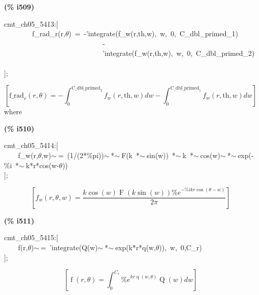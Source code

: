 \documentclass[fleqn]{article}
\begin{document}
\noindent
\begin{minipage}[t]{4.000000em}\color{red}\bfseries
(\% i509)	
\end{minipage}
\begin{minipage}[t]{\textwidth}\color{blue}
cmt\_ch05\_5413:[\\
\ \ \ \ \ \ \ \ f\_rad\_r(r,\ensuremath{\theta})\ =\ -'integrate(f\_w(r,th,w),\ w,\ 0,\ C\_dbl\_primed\_1)\\
\ \ \ \ \ \ \ \ \ \ \ \ \ \ \ \ \ \ \ \ \ \ \ \ \ \ \ \ -\\
\ \ \ \ \ \ \ \ \ \ \ \ \ \ \ \ \ \ \ \ \ \ \ \ \ \ \ \ 'integrate(f\_w(r,th,w),\ w,\ 0,\ C\_dbl\_primed\_2)\\
\\
];
\end{minipage}
\[\displaystyle \tag{\% o509} 
\left[ {{\ensuremath{\mathrm{f\_ rad}}}_r}\left( r\operatorname{,}\theta \right) =-\int_{0}^{{{\ensuremath{\mathrm{C\_ dbl\_ primed}}}_2}}{\left. {f_w}\left( r\operatorname{,}\ensuremath{\mathrm{th}}\operatorname{,}w\right) dw\right.}-\int_{0}^{{{\ensuremath{\mathrm{C\_ dbl\_ primed}}}_1}}{\left. {f_w}\left( r\operatorname{,}\ensuremath{\mathrm{th}}\operatorname{,}w\right) dw\right.}\right] \mbox{}
\]
where


\noindent
\begin{minipage}[t]{4.000000em}\color{red}\bfseries
(\% i510)	
\end{minipage}
\begin{minipage}[t]{\textwidth}\color{blue}
cmt\_ch05\_5414:[\\
\ \ \ \ f\_w(r,\ensuremath{\theta},w)\ensuremath{\sim\ }=\ (1/(2*\%pi))\ensuremath{\sim\ }*\ensuremath{\sim\ }F(k\ *\ensuremath{\sim\ }sin(w))\ *\ensuremath{\sim\ }k\ *\ensuremath{\sim\ }cos(w)\ensuremath{\sim\ }*\ensuremath{\sim\ }exp(-\%i\ *\ensuremath{\sim\ }k*r*cos(w-\ensuremath{\theta}))\\
];
\end{minipage}
\[\displaystyle \tag{\% o510} 
\left[ {f_w}\left( r\operatorname{,}\theta \operatorname{,}w\right) =\frac{k \cos{(w)} \operatorname{F}\left( k \sin{(w)}\right)  {{\% e}^{-\% i k r \cos{\left( \theta -w\right) }}}}{2 \ensuremath{\pi} }\right] \mbox{}
\]


\noindent
\begin{minipage}[t]{4.000000em}\color{red}\bfseries
(\% i511)	
\end{minipage}
\begin{minipage}[t]{\textwidth}\color{blue}
cmt\_ch05\_5415:[\\
\ \ \ \ f(r,\ensuremath{\theta})\ensuremath{\sim\ }=\ 'integrate(Q(w)\ensuremath{\sim\ }*\ensuremath{\sim\ }exp(k*r*q(w,\ensuremath{\theta})),\ w,\ 0,C\_r)\\
];
\end{minipage}
\[\displaystyle \tag{\% o511} 
\left[ \operatorname{f}\left( r\operatorname{,}\theta \right) =\int_{0}^{{C_r}}{\left. {{\% e}^{k r \operatorname{q}\left( w\operatorname{,}\theta \right) }} \operatorname{Q}(w)dw\right.}\right] \mbox{}
\]
\end{document}
